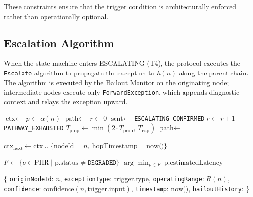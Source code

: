 These constraints ensure that the trigger condition is architecturally enforced rather than operationally optional.

\subsection{Escalation Algorithm}\label{sec:escalation-algorithm}

When the state machine enters ESCALATING (T4), the protocol executes the \texttt{Escalate} algorithm to propagate the exception to $h(n)$ along the parent chain. The algorithm is executed by the Bailout Monitor on the originating node; intermediate nodes execute only \texttt{ForwardException}, which appends diagnostic context and relays the exception upward.

\begin{algorithm}[htbp]
\caption{Bailout Protocol escalation algorithm.}
\label{alg:escalate}
\begin{algorithmic}[1]
  \State $\text{ctx} \leftarrow$ 
  \State $p \leftarrow \alpha(n)$ 
  \State $\text{path} \leftarrow$ 
  \State $r \leftarrow 0$ 
    \State $\text{sent} \leftarrow$ 
      \State \Return \texttt{ESCALATING\_CONFIRMED}
    \EndIf
    \State $r \leftarrow r + 1$
      \State {}
      \State {}
      \State \Return \texttt{PATHWAY\_EXHAUSTED}
    \EndIf
    \State $T_{\text{prop}} \leftarrow \min(2 \cdot T_{\text{prop}},\; T_{\text{cap}})$
    \State {}
    \State $\text{path} \leftarrow$  
  \EndWhile
\EndProcedure

  \State $\text{ctx}_\text{next} \leftarrow \text{ctx} \cup \{\text{nodeId} = n,\; \text{hopTimestamp} = \text{now()}\}$
  \State {}
\EndProcedure

  \State $F \leftarrow \{p \in \text{PHR} \mid \text{p.status} \neq \texttt{DEGRADED}\}$
  \State \Return $\arg\!\min_{p \in F}\; \text{p.estimatedLatency}$
\EndProcedure

  \State \Return $\{$
    \texttt{originNodeId}: $n$,
    \texttt{exceptionType}: trigger.type,
    \texttt{operatingRange}: $R(n)$,
    \texttt{confidence}: $\text{confidence}(n, \text{trigger.input})$,
    \texttt{timestamp}: $\text{now()}$,
    \texttt{bailoutHistory}: 
  $\}$
\EndProcedure
\end{algorithmic}
\end{algorithm}

